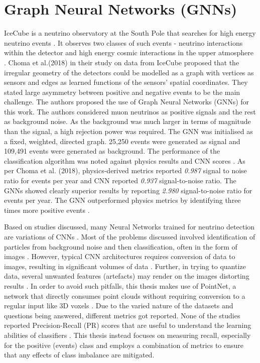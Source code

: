 \section{Graph Neural Networks (GNNs)}
IceCube is a neutrino observatory at the South Pole that searches for high energy neutrino events \cite{icecube2013evidence}. It observes two classes of such events - neutrino interactions within the detector and high energy cosmic interactions in the upper atmosphere \cite{icecube2013evidence}. Choma et al.(2018) in their study on data from IceCube proposed that the irregular geometry of the detectors could be modelled as a graph with vertices as sensors and edges as learned functions of the sensors' spatial coordinates. They stated large asymmetry between positive and negative events to be the main challenge. The authors proposed the use of Graph Neural Networks (GNNs) for this work. The authors considered muon neutrinos as positive signals and the rest as background noise. As the background was much larger in terms of magnitude than the signal, a high rejection power was required. The GNN was initialised as a fixed, weighted, directed graph. 25,250 events were generated as signal and 109,491 events were generated as background. The performance of the classification algorithm was noted against physics results and CNN scores \cite{choma2018graph}. As per Choma et al. (2018), physics-derived metrics reported \textit{0.987} signal to noise ratio for events per year and CNN reported \textit{0.937} signal-to-noise ratio. The GNNs showed clearly superior results by reporting \textit{2.980} signal-to-noise ratio for events per year. The GNN outperformed physics metrics by identifying three times more positive events \cite{choma2018graph}.


Based on studies discussed, many Neural Networks trained for neutrino detection are variations of CNNs \cite{baldi2014searching, szadkowski2015artificial, edelen2016neural}. Most of the problems discussed involved identification of particles from background noise and then classification, often in the form of images \cite{acciarri2016long, acciarri2017convolutional}. However, typical CNN architectures requires conversion of data to images, resulting in significant volumes of data \cite{qi2017pointnet}. Further, in trying to quantize data, several unwanted features (artefacts) may render on the images distorting results \cite{qi2017pointnet, qi2017pointnet++}. In order to avoid such pitfalls, this thesis makes use of PointNet, a network that directly consumes point clouds without requiring conversion to a regular input like 3D voxels \cite{qi2017pointnet}. Due to the varied nature of the datasets and questions being answered, different metrics got reported. None of the studies reported Precision-Recall (PR) scores that are useful to understand the learning abilities of classifiers \cite{goodfellow2016convolutional}. This thesis instead focuses on measuring recall, especially for the positive (events) class and employs a combination of metrics to ensure that any effects of class imbalance are mitigated. 

